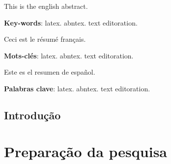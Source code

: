 \documentclass[12pt,openright,twoside,a4paper]{abntex2}
\begin{document}
\begin{resumo}[Abstract]
 This is the english abstract.

 \vspace{1cm}
 
 \noindent 
 \textbf{Key-words}: latex. abntex. text editoration.
\end{resumo}

\begin{resumo}[Résumé]
  Ceci est le résumé français.
 
 \vspace{1cm}
 
 \noindent
 \textbf{Mots-clés}: latex. abntex. text editoration.
\end{resumo}

\begin{resumo}[Resumen]
  Este es el resumen de español.
  
 \vspace{1cm}
 
  \noindent
  \textbf{Palabras clave}: latex. abntex. text editoration.
\end{resumo}

\listoffigures

\listoftables



\tableofcontents




\chapter*{Introdução}

\lipsum[1-2]

\part{Preparação da pesquisa}
\end{document}
